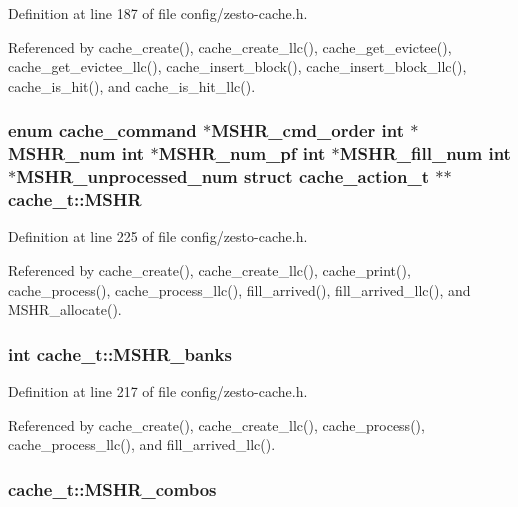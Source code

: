Definition at line 187 of file config/zesto-cache.h.

Referenced by cache\_\-create(), cache\_\-create\_\-llc(), cache\_\-get\_\-evictee(), cache\_\-get\_\-evictee\_\-llc(), cache\_\-insert\_\-block(), cache\_\-insert\_\-block\_\-llc(), cache\_\-is\_\-hit(), and cache\_\-is\_\-hit\_\-llc().
\subsubsection[{MSHR}]{\setlength{\rightskip}{0pt plus 5cm}enum {\bf cache\_\-command} $\ast$MSHR\_\-cmd\_\-order int $\ast$MSHR\_\-num int $\ast$MSHR\_\-num\_\-pf int $\ast$MSHR\_\-fill\_\-num int $\ast$MSHR\_\-unprocessed\_\-num struct {\bf cache\_\-action\_\-t} $\ast$$\ast$ {\bf cache\_\-t::MSHR}\hspace{0.3cm}{\tt  [read]}}\label{structcache__t_5057f7ad4ccb4f030eefb9956047df22}




Definition at line 225 of file config/zesto-cache.h.

Referenced by cache\_\-create(), cache\_\-create\_\-llc(), cache\_\-print(), cache\_\-process(), cache\_\-process\_\-llc(), fill\_\-arrived(), fill\_\-arrived\_\-llc(), and MSHR\_\-allocate().
\subsubsection[{MSHR\_\-banks}]{\setlength{\rightskip}{0pt plus 5cm}int {\bf cache\_\-t::MSHR\_\-banks}}\label{structcache__t_9bc12fa089d7970b4b137f431f78e93e}




Definition at line 217 of file config/zesto-cache.h.

Referenced by cache\_\-create(), cache\_\-create\_\-llc(), cache\_\-process(), cache\_\-process\_\-llc(), and fill\_\-arrived\_\-llc().
\subsubsection[{MSHR\_\-combos}]{ {\bf cache\_\-t::MSHR\_\-combos}}\label{structcache__t_a58f6a60944c998b8d073ebf0be69fdd}




